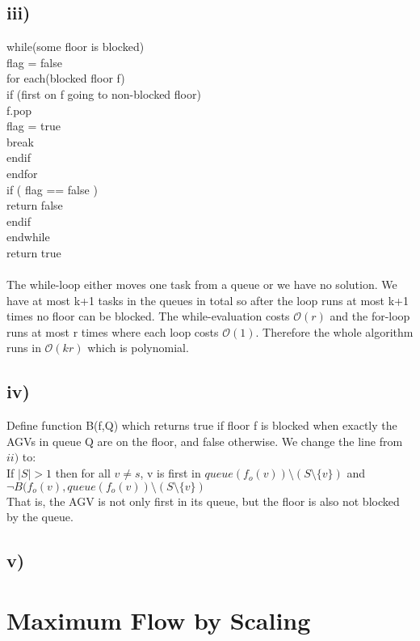 \documentclass[a4paper]{article}
\begin{document}
\subsection*{iii)}
while(some floor is blocked)\\
\indent flag = false\\
\indent for each(blocked floor f)\\
\indent \indent if (first on f going to non-blocked floor) \\
\indent\indent\indent f.pop \\
\indent\indent\indent flag = true \\
\indent\indent\indent break \\
\indent\indent endif\\
\indent endfor\\
\indent if ( flag == false ) \\
\indent\indent return false \\
\indent endif\\
endwhile \\
return true\\
\\
The while-loop either moves one task from a queue or we have no solution. We have at most k+1 tasks in the queues in total so after the loop runs at most k+1 times no floor can be blocked. The while-evaluation costs $\mathcal{O}(r)$ and the for-loop runs at most r times where each loop costs $\mathcal{O}(1)$. Therefore the whole algorithm runs in $\mathcal{O}(kr)$ which is polynomial.

\subsection*{iv)}
Define function B(f,Q) which returns true if floor f is blocked when exactly the AGVs in queue Q are on the floor, and false otherwise. We change the line from $ii)$ to:\\
If $|S|>1$ then for all $v \neq s$, v is first in $queue(f_o(v))\setminus(S \setminus \{v\})$ and $ \lnot B(f_o(v), queue(f_o(v))\setminus(S \setminus \{v\})$ \\
That is, the AGV is not only first in its queue, but the floor is also not blocked by the queue.
\subsection*{v)}

\section{Maximum Flow by Scaling}
\end{document}
